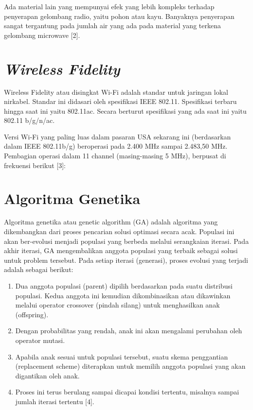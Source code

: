 \documentclass[12pt,a4paper,oneside,titlepage]{report}
\begin{document}
		Ada material lain yang mempunyai efek yang lebih kompleks terhadap penyerapan gelombang radio, yaitu pohon atau kayu. Banyaknya penyerapan sangat tergantung pada jumlah air yang ada pada material yang terkena gelombang microwave [2].
		
		\section{\emph{Wireless Fidelity}}
		Wireless Fidelity atau disingkat Wi-Fi adalah standar untuk jaringan lokal nirkabel. Standar ini didasari oleh spesifikasi IEEE 802.11. Spesifikasi terbaru hingga saat ini yaitu 802.11ac. Secara berturut spesifikasi yang ada saat ini yaitu 802.11 b/g/n/ac.
		
		Versi Wi-Fi yang paling luas dalam pasaran USA sekarang ini (berdasarkan dalam IEEE 802.11b/g) beroperasi pada 2.400 MHz sampai 2.483,50 MHz. Pembagian operasi dalam 11 channel (masing-masing 5 MHz), berpusat di frekuensi berikut [3]:
		
		\section{Algoritma Genetika}
		Algoritma genetika atau genetic algorithm (GA) adalah algoritma yang dikembangkan dari proses pencarian solusi optimasi secara acak. Populasi ini akan ber-evolusi menjadi populasi yang berbeda melalui serangkaian iterasi. Pada akhir iterasi, GA mengembalikan anggota populasi yang terbaik sebagai solusi untuk problem tersebut. Pada setiap iterasi (generasi), proses evolusi yang terjadi adalah sebagai berikut:
		\begin{enumerate}
			\item Dua anggota populasi (parent) dipilih berdasarkan pada suatu distribusi populasi. Kedua anggota ini kemudian dikombinasikan atau dikawinkan melalui operator crossover (pindah silang) untuk menghasilkan anak (offspring).
			
			\item Dengan probabilitas yang rendah, anak ini akan mengalami perubahan oleh operator mutasi.
			
			\item Apabila anak sesuai untuk populasi tersebut, suatu skema penggantian (replacement scheme) diterapkan untuk memilih anggota populasi yang akan digantikan oleh anak.
			
			\item Proses ini terus berulang sampai dicapai kondisi tertentu, misalnya sampai jumlah iterasi tertentu [4].
		\end{enumerate}
		
\end{document}
